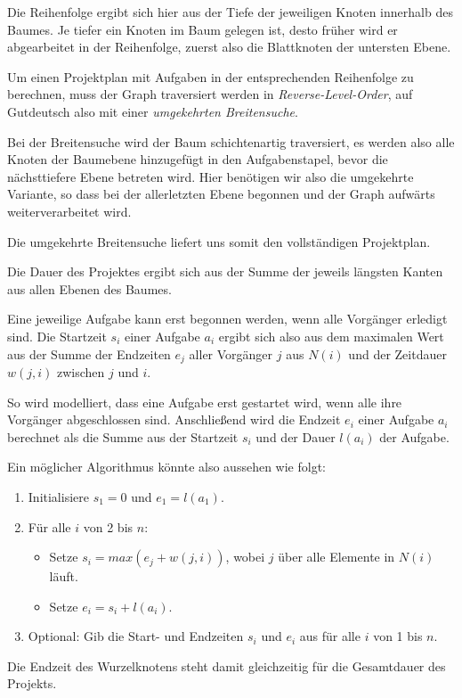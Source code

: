 \begin{aufgabe}
\begin{teile}
	\item
	Die Reihenfolge ergibt sich hier aus der Tiefe der jeweiligen Knoten innerhalb des Baumes. Je tiefer ein Knoten im Baum gelegen ist, desto früher wird er abgearbeitet in der Reihenfolge, zuerst also die Blattknoten der untersten Ebene.
	
	Um einen Projektplan mit Aufgaben in der entsprechenden Reihenfolge zu berechnen, muss der Graph traversiert werden in \textit{Reverse-Level-Order}, auf Gutdeutsch also mit einer \textit{umgekehrten Breitensuche}.
	 
	Bei der Breitensuche wird der Baum schichtenartig traversiert, es werden also alle Knoten der Baumebene hinzugefügt in den Aufgabenstapel, bevor die nächsttiefere Ebene betreten wird. Hier benötigen wir also die umgekehrte Variante, so dass bei der allerletzten Ebene begonnen und der Graph aufwärts weiterverarbeitet wird. 
	
	Die umgekehrte Breitensuche liefert uns somit den vollständigen Projektplan. \\
	
	\item
	Die Dauer des Projektes ergibt sich aus der Summe der jeweils längsten Kanten aus allen Ebenen des Baumes.
	
	Eine jeweilige Aufgabe kann erst begonnen werden, wenn alle Vorgänger erledigt sind. Die Startzeit $s_i$ einer Aufgabe $a_i$ ergibt sich also aus dem maximalen Wert aus der Summe der Endzeiten $e_j$ aller Vorgänger $j$ aus $N(i)$ und der Zeitdauer $w(j,i)$ zwischen $j$ und $i$. 
	
	So wird modelliert, dass eine Aufgabe erst gestartet wird, wenn alle ihre Vorgänger abgeschlossen sind. Anschließend wird die Endzeit $e_i$ einer Aufgabe $a_i$ berechnet als die Summe aus der Startzeit $s_i$ und der Dauer $l(a_i)$ der Aufgabe. 
	
	Ein möglicher Algorithmus könnte also aussehen wie folgt:

	\begin{enumerate}
        \item Initialisiere $s_1 = 0$ und $e_1 = l(a_1)$.
        \item
        Für alle $i$ von 2 bis $n$:
        \begin{itemize}
        	\item Setze $s_i = max(e_j + w(j, i))$, wobei $j$ über alle Elemente in $N(i)$ läuft.
        	\item Setze $e_i = s_i + l(a_i)$.
    	\end{itemize}
    	\item Optional: Gib die Start- und Endzeiten $s_i$ und $e_i$ aus für alle $i$ von 1 bis $n$.
        \end{enumerate}
    
	Die Endzeit des Wurzelknotens steht damit gleichzeitig für die Gesamtdauer des Projekts.
	\end{teile}
	\end{aufgabe}
	
